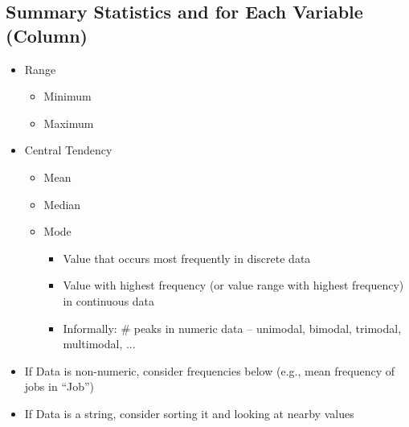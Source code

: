 \documentclass[11pt]{article}
\theoremstyle{definition}
\begin{document}
\subsection{Summary Statistics and for Each Variable (Column)}
\begin{itemize}
    \item Range
    \begin{itemize}
        \item Minimum
        \item Maximum
    \end{itemize}
    \item Central Tendency
    \begin{itemize}
        \item Mean
        \item Median
        \item Mode
        \begin{itemize}
            \item Value that occurs most frequently in discrete data
            \item Value with highest frequency (or value range with highest frequency) in continuous data
            \item Informally: \# peaks in numeric data – unimodal, bimodal, trimodal, multimodal, ...
        \end{itemize}
    \end{itemize}
    \item If Data is non-numeric, consider frequencies below (e.g., mean frequency of jobs in “Job”)
    \item If Data is a string, consider sorting it and looking at nearby values
\end{itemize}
\end{document}
